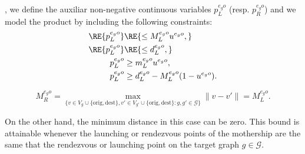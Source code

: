 \noindent
{}, we define the auxiliar non-negative continuous variables $p_L^{e_go}$ (resp. $p_R^{e_go}$) and we model the product by including the following constraints:
\begin{align*}
\RE{p_L^{e_go}} & \RE{\leq  M_L^{e_go}u^{e_go},}\\
\RE{p_L^{e_go}} & \RE{\leq d_L^{e_go},} \\
p_L^{e_go} & \geq m_L^{e_go} u^{e_go}, \\
p_L^{e_go} & \geq d_L^{e_go} - M_L^{e_go}(1-u^{e_go}).
\end{align*}

$$
M_R^{e_go} = \max_{\{v\in V_g\cup\{\text{orig}, \text{dest}\}, v'\in V_{g'}\cup\{\text{orig}, \text{dest}\} : g, g'\in\mathcal G\}} \|v - v'\| = M_L^{e_go}.
$$

\noindent
On the other hand, the minimum distance in this case can be zero. This bound is attainable whenever the launching or rendezvous points of the mothership are the same that the rendezvous or launching point on the target graph $g\in \mathcal{G}$.



